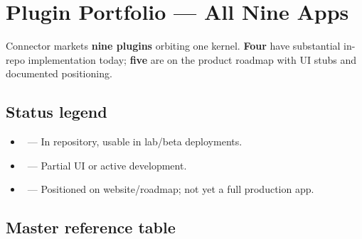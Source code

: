 \chapter{Plugin Portfolio --- All Nine Apps}

Connector markets \textbf{nine plugins} orbiting one kernel. \textbf{Four} have substantial in-repo implementation today; \textbf{five} are on the product roadmap with UI stubs and documented positioning.

\section{Status legend}

\begin{itemize}
  \item \statusship\ --- In repository, usable in lab/beta deployments.
  \item \statusbeta\ --- Partial UI or active development.
  \item \statusplan\ --- Positioned on website/roadmap; not yet a full production app.
\end{itemize}

\section{Master reference table}

